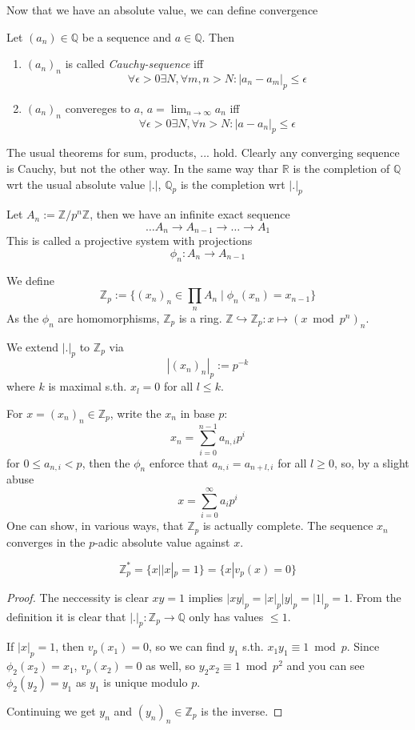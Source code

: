 Now that we have an absolute value, we can define convergence
\begin{definition}
  Let $(a_n)\in \mathbb Q$ be a sequence and $a\in \mathbb Q$. Then
  \begin{enumerate}
     \item $(a_n)_n$ is called {\em Cauchy-sequence} iff
       $$\forall \epsilon >0 \exists N, \forall m,n>N: |a_n-a_m|_p\le \epsilon$$
     \item $(a_n)_n$ convereges to $a$, $a = \lim_{n\to\infty} a_n$ iff
       $$\forall \epsilon>0\exists N, \forall n>N: |a-a_n|_p\le \epsilon$$
  \end{enumerate}
\end{definition}
The usual theorems for sum, products, ... hold. Clearly
any converging sequence is Cauchy, but not the other way.
In the same way thar $\mathbb R$ is the completion of $\mathbb Q$ wrt the usual
absolute value $|.|$, $\mathbb Q_p$ is the completion wrt $|.|_p$

\begin{definition}
  Let $A_n := \mathbb Z/p^n\mathbb Z$, then we have an infinite
  exact sequence
  $$\ldots A_n \to A_{n-1} \to \ldots \to A_1$$
  This is called a projective system with projections 
  $$\phi_n:A_n \to A_{n-1}$$

  We define 
  $$\mathbb Z_p := \{ (x_n)_n \in \prod_n A_n \mid \phi_n(x_n) = x_{n-1}\}$$
  As the $\phi_n$ are homomorphisms, $\mathbb Z_p$ is a ring.
  $\mathbb Z \hookrightarrow \mathbb Z_p: x \mapsto (x \bmod p^n)_n$.

  We extend $|.|_p$ to $\mathbb Z_p$ via
  $$|(x_n)_n|_p := p^{-k}$$
  where $k$ is maximal s.th. $x_l = 0$ for all $l\le k$.
\end{definition}

For $x = (x_n)_n\in \mathbb Z_p$, write the $x_n$ in base $p$:
$$x_n = \sum_{i=0}^{n-1} a_{n,i} p^i $$
for $0\le a_{n,i}<p$, then the $\phi_n$ enforce that
$a_{n, i} = a_{n+l, i}$ for all $l\ge 0$, so, by a slight abuse
$$x = \sum_{i=0}^\infty a_i p^i$$
One can show, in various ways, that $\mathbb Z_p$ is actually complete.
The sequence $x_n$ converges in the $p$-adic absolute value against $x$.

\begin{lemma}
  $$\mathbb Z_p^* = \{x | |x|_p = 1\} = \{x | v_p(x) = 0\}$$
\end{lemma}
\begin{proof}
  The neccessity is clear $xy = 1$ implies $|xy|_p = |x|_p |y|_p = |1|_p = 1$.
  From the definition it is clear that $|.|_p:\mathbb Z_p \to \mathbb Q$ 
  only has values $\le 1$.

  If $|x|_p = 1$, then $v_p(x_1) = 0$, so we can find $y_1$ s.th.
  $x_1y_1 \equiv 1 \bmod p$. Since $\phi_2(x_2) = x_1$, $v_p(x_2) = 0$ as well,
  so $y_2x_2 \equiv 1\bmod p^2$ and you can see $\phi_2(y_2) = y_1$ as $y_1$ is
  unique modulo $p$.

  Continuing we get $y_n$ and $(y_n)_n\in \mathbb Z_p$ is the inverse.
\end{proof}

